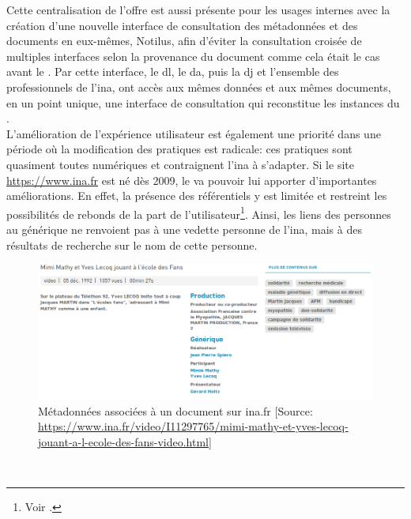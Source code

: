 Cette centralisation de l'offre est aussi présente pour les usages internes avec la création d'une nouvelle interface de consultation des métadonnées et des documents en eux-mêmes, Notilus, afin d'éviter la consultation croisée de multiples interfaces selon la provenance du document comme cela était le cas avant le \ldd. Par cette interface, le \ac{dl}, le \ac{da}, puis la \ac{dj} et l'ensemble des professionnels de l'\ac{ina}, ont accès aux mêmes données et aux mêmes documents, en un point unique, une interface de consultation qui reconstitue les instances du \ldd.\\

L'amélioration de l'expérience utilisateur est également une priorité dans une période où la modification des pratiques est radicale: ces pratiques sont quasiment toutes numériques et contraignent l'\ac{ina} à s'adapter. Si le site \url{https://www.ina.fr} est né dès 2009, le \ldd va pouvoir lui apporter d'importantes améliorations. En effet, la présence des référentiels y est limitée et restreint les possibilités de rebonds de la part de l'utilisateur\footnote{Voir .}. Ainsi, les liens des personnes au générique ne renvoient pas à une vedette personne de l'\ac{ina}, mais à des résultats de recherche sur le nom de cette personne. 
\begin{figure}[!h]
	\centering
	\includegraphics[width=13cm]{images/inafr_ecole_fans.png}
	\caption[Métadonnées associées à un document sur ina.fr]{Métadonnées associées à un document sur ina.fr [Source: \url{https://www.ina.fr/video/I11297765/mimi-mathy-et-yves-lecoq-jouant-a-l-ecole-des-fans-video.html}]}
	\label{inafr_result}
\end{figure}\\
